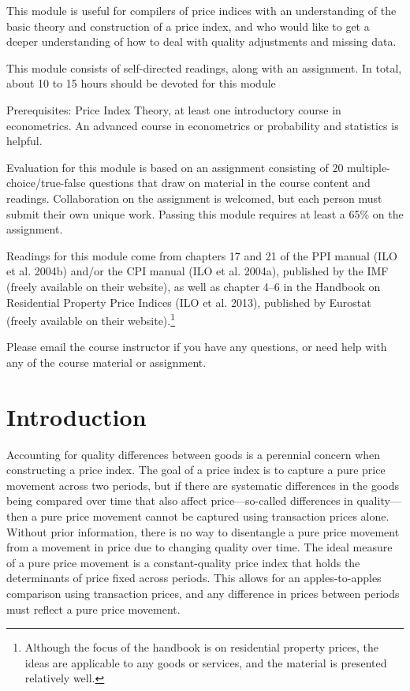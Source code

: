 \documentclass[]{article}
\begin{document}
This module is useful for compilers of price indices with an understanding of the basic theory and construction of a price index, and who would like to get a deeper understanding of how to deal with quality adjustments and missing data.

This module consists of self-directed readings, along with an assignment. In total, about 10 to 15 hours should be devoted for this module

Prerequisites: Price Index Theory, at least one introductory course in econometrics. An advanced course in econometrics or probability and statistics is helpful.

Evaluation for this module is based on an assignment consisting of 20 multiple-choice/true-false questions that draw on material in the course content and readings. Collaboration on the assignment is welcomed, but each person must submit their own unique work. Passing this module requires at least a 65\% on the assignment.

Readings for this module come from chapters 17 and 21 of the PPI manual (ILO et al. 2004b) and/or the CPI manual (ILO et al. 2004a), published by the IMF (freely available on their website), as well as chapter 4--6 in the Handbook on Residential Property Price Indices (ILO et al. 2013), published by Eurostat (freely available on their website).\footnote{Although the focus of the handbook is on residential property prices, the ideas are applicable to any goods or services, and the material is presented relatively well.}

Please email the course instructor if you have any questions, or need help with any of the course material or assignment.

\hypertarget{introduction-1}{%
\section{Introduction}\label{introduction-1}}

Accounting for quality differences between goods is a perennial concern when constructing a price index. The goal of a price index is to capture a pure price movement across two periods, but if there are systematic differences in the goods being compared over time that also affect price---so-called differences in quality---then a pure price movement cannot be captured using transaction prices alone. Without prior information, there is no way to disentangle a pure price movement from a movement in price due to changing quality over time. The ideal measure of a pure price movement is a constant-quality price index that holds the determinants of price fixed across periods. This allows for an apples-to-apples comparison using transaction prices, and any difference in prices between periods must reflect a pure price movement.
\end{document}
